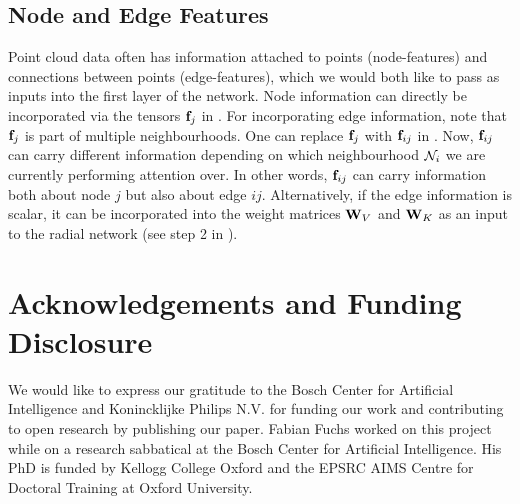 \documentclass{article}
\begin{document}
\subsection{Node and Edge Features}
Point cloud data often has information attached to points (node-features) and connections between points (edge-features), which we would both like to pass as inputs into the first layer of the network.
Node information can directly be incorporated via the tensors $\textbf{f}_j$ in .
For incorporating edge information, note that $\textbf{f}_j$ is part of multiple neighbourhoods. One can replace $\textbf{f}_j$ with $\textbf{f}_{ij}$ in . Now, $\textbf{f}_{ij}$ can carry different information depending on which neighbourhood $\mathcal{N}_i$ we are currently performing attention over. In other words, $\textbf{f}_{ij}$ can carry information both about node $j$ but also about edge $ij$. Alternatively, if the edge information is scalar, it can be incorporated into the weight matrices $\textbf{W}_V$ and $\textbf{W}_K$ as an input to the radial network (see step 2 in ).










\section*{Acknowledgements and Funding Disclosure}
We would like to express our gratitude to the Bosch Center for Artificial Intelligence and Konincklijke Philips N.V. for funding our work and contributing to open research by publishing our paper. Fabian Fuchs worked on this project while on a research sabbatical at the Bosch Center for Artificial Intelligence. His PhD is funded by Kellogg College Oxford and the EPSRC AIMS Centre
for Doctoral Training at Oxford University.

\newpage




\end{document}
